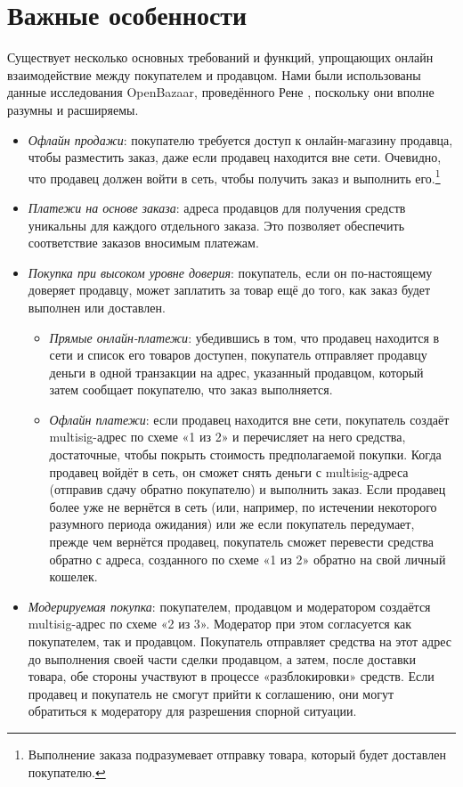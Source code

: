 \section{Важные особенности}
\label{sec:escrowed-marketplace-essential-features}

Существует несколько основных требований и функций, упрощающих онлайн взаимодействие между покупателем и продавцом. Нами были использованы данные исследования OpenBazaar, проведённого Рене \cite{openbazaar-rbrunner-investigation}, поскольку они вполне разумны и расширяемы.
\begin{itemize}
    \item {\em Офлайн продажи}: покупателю требуется доступ к онлайн-магазину продавца, чтобы разместить заказ, даже если продавец находится вне сети. Очевидно, что продавец должен войти в сеть, чтобы получить заказ и выполнить его.\footnote{Выполнение заказа подразумевает отправку товара, который будет доставлен покупателю.}
    \item {\em Платежи на основе заказа}: адреса продавцов для получения средств уникальны для каждого отдельного заказа. Это позволяет обеспечить соответствие заказов вносимым платежам.
    \item {\em Покупка при высоком уровне доверия}: покупатель, если он по-настоящему доверяет продавцу, может заплатить за товар ещё до того, как заказ будет выполнен или достав\-лен.
    \begin{itemize}
        \item {\em Прямые онлайн-платежи}: убедившись в том, что продавец находится в сети и список его товаров доступен, покупатель отправляет продавцу деньги в одной транзакции на адрес, указанный продавцом, который затем сообщает покупателю, что заказ выполняется.
        \item {\em Офлайн платежи}: если продавец находится вне сети, покупатель создаёт multisig-адрес по схеме «1 из 2» и перечисляет на него средства, достаточные, чтобы по\-крыть стоимость предполагаемой покупки. Когда продавец войдёт в сеть, он смо\-жет снять деньги с multisig-адреса (отправив сдачу обратно покупателю) и выпол\-нить заказ. Если продавец более уже не вернётся в сеть (или, например, по истече\-нии некоторого разумного периода ожидания) или же если покупатель передумает, прежде чем вернётся продавец, покупатель сможет перевести средства обратно с адреса, созданного по схеме «1 из 2» обратно на свой личный кошелек.
    \end{itemize}{}
    \item {\em Модерируемая покупка}: покупателем, продавцом и модератором создаётся multisig-адрес по схеме «2 из 3». Модератор при этом согласуется как покупателем, так и продавцом. Покупатель отправляет средства на этот адрес до выполнения своей части сделки про\-давцом, а затем, после доставки товара, обе стороны участвуют в процессе «разблоки\-ровки» средств. Если продавец и покупатель не смогут прийти к соглашению, они могут обратиться к модератору для разрешения спорной ситуации.
\end{itemize}

